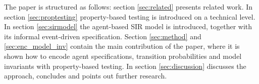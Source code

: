 The paper is structured as follows: section \ref{sec:related} presents related work. In section \ref{sec:proptesting} property-based testing is introduced on a technical level. In section \ref{sec:sirmodel} the agent-based SIR model is introduced, together with its informal event-driven specification. Section \ref{sec:method} and \ref{sec:enc_model_inv} contain the main contribution of the paper, where it is shown how to encode agent specifications, transition probabilities and model invariants with property-based testing. In section \ref{sec:discussion} discusses the approach, concludes and  points out further research.